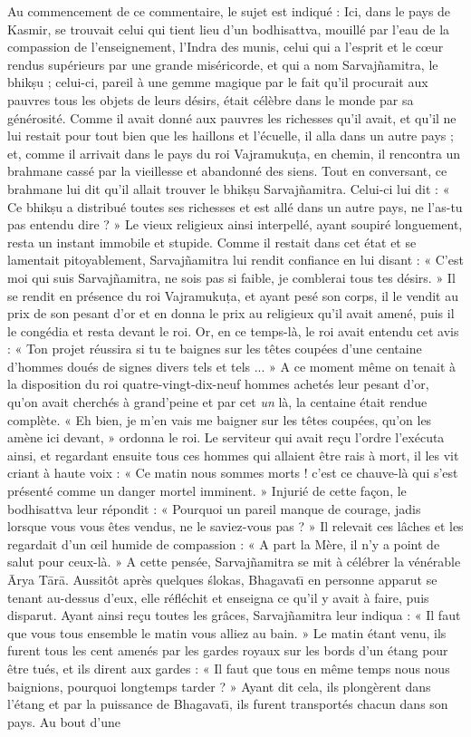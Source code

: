 \documentclass[a4paper, 11pt, oneside, french]{article}
\begin{document}
Au commencement de ce commentaire, le sujet est indiqué : Ici, dans le pays de Kasmir, se trouvait celui qui tient lieu d'un bodhisattva, mouillé par l'eau de la compassion de l'enseignement, l'Indra des munis, celui qui a l'esprit et le cœur rendus supérieurs par une grande miséricorde, et qui a nom Sarvaj\~{n}amitra, le bhik\d{s}u ; celui-ci, pareil à une gemme magique par le fait qu'il procurait aux pauvres tous les objets de leurs désirs, était célèbre dans le monde par sa générosité. Comme il avait donné aux pauvres les richesses qu'il avait, et qu'il ne lui restait pour tout bien que les haillons et l'écuelle, il alla dans un autre pays ; et, comme il arrivait dans le pays du roi Vajramuku\d{t}a, en chemin, il rencontra un brahmane cassé par la vieillesse et abandonné des siens. Tout en conversant, ce brahmane lui dit qu'il allait trouver le bhik\d{s}u Sarvaj\~{n}amitra. Celui-ci lui dit : « Ce bhik\d{s}u a distribué toutes ses richesses et est allé dans un autre pays, ne l'as-tu pas entendu dire ? » Le vieux religieux ainsi interpellé, ayant soupiré longuement, resta un instant immobile et stupide. Comme il restait dans cet état et se lamentait pitoyablement, Sarvaj\~{n}amitra lui rendit confiance en lui disant : « C'est moi qui suis Sarvaj\~{n}amitra, ne sois pas si faible, je comblerai tous tes désirs. » Il se rendit en présence du roi Vajramuku\d{t}a, et ayant pesé son corps, il le vendit au prix de son pesant d'or et en donna le prix au religieux qu'il avait amené, puis il le congédia et resta devant le roi. Or, en ce temps-là, le roi avait entendu cet avis : « Ton projet réussira si tu te baignes sur les têtes coupées d'une centaine d'hommes doués de signes divers tels et tels ... » A ce moment même on tenait à la disposition du roi quatre-vingt-dix-neuf hommes achetés leur pesant d'or, qu'on avait cherchés à grand'peine et par cet \emph{un} là, la centaine était rendue complète. « Eh bien, je m'en vais me baigner sur les têtes coupées, qu'on les amène ici devant, » ordonna le roi. Le serviteur qui avait reçu l'ordre l'exécuta ainsi, et regardant ensuite tous ces hommes qui allaient être rais à mort, il les vit criant à haute voix : « Ce matin nous sommes morts ! c'est ce chauve-là qui s'est présenté comme un danger mortel imminent. » Injurié de cette façon, le bodhisattva leur répondit : « Pourquoi un pareil manque de courage, jadis lorsque vous vous êtes vendus, ne le saviez-vous pas ? » Il relevait ces lâches et les regardait d'un œil humide de compassion : « A part la Mère, il n'y a point de salut pour ceux-là. » A cette pensée, Sarvaj\~{n}amitra se mit à célébrer la vénérable \={A}rya T\={a}r\={a}. Aussitôt après quelques \'{s}lokas, Bhagavat\={\i} en personne apparut se tenant au-dessus d'eux, elle réfléchit et enseigna ce qu'il y avait à faire, puis disparut. Ayant ainsi reçu toutes les grâces, Sarvaj\~{n}amitra leur indiqua : « Il faut que vous tous ensemble le matin vous alliez au bain. » Le matin étant venu, ils furent tous les cent amenés par les gardes royaux sur les bords d'un étang pour être tués, et ils dirent aux gardes : « Il faut que tous en même temps nous nous baignions, pourquoi longtemps tarder ? » Ayant dit cela, ils plongèrent dans l'étang et par la puissance de Bhagavat\={\i}, ils furent transportés chacun dans son pays. Au bout d'une 
\end{document}
